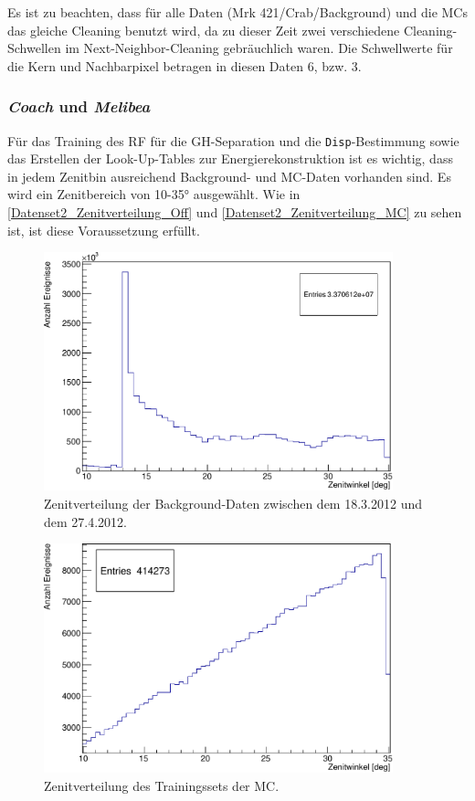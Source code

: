 Es ist zu beachten, dass für alle Daten (Mrk 421/Crab/Background) und die MCs das gleiche Cleaning benutzt wird, da zu dieser Zeit zwei verschiedene Cleaning-Schwellen im Next-Neighbor-Cleaning gebräuchlich waren.
Die Schwellwerte für die Kern und Nachbarpixel betragen in diesen Daten 6, bzw. 3.


\subsubsection{\textit{Coach} und \textit{Melibea}}
Für das Training des RF für die GH-Separation und die \texttt{Disp}-Bestimmung sowie das Erstellen der Look-Up-Tables zur Energierekonstruktion ist es wichtig, dass in jedem Zenitbin ausreichend Background- und MC-Daten vorhanden sind.
Es wird ein Zenitbereich von 10-35° ausgewählt.
Wie in \autoref{Datenset2_Zenitverteilung_Off} und \autoref{Datenset2_Zenitverteilung_MC} zu sehen ist, ist diese Voraussetzung erfüllt.

\begin{figure}
    \centering
    \includegraphics[width=0.9\textwidth]{./Plots/04_MrkAnalyse/Datenset2/Datenset2_Background_MPointingPos1_fZd.pdf}
    \caption{Zenitverteilung der Background-Daten zwischen dem 18.3.2012 und dem 27.4.2012.}
    \label{Datenset2_Zenitverteilung_Off}
\end{figure}

\begin{figure}
    \centering
    \includegraphics[width=0.9\textwidth]{./Plots/04_MrkAnalyse/Datenset2/Datenset2_MC_MPointingPos1_fZd.pdf}
    \caption{Zenitverteilung des Trainingssets der MC.}
    \label{Datenset2_Zenitverteilung_MC}
\end{figure}

